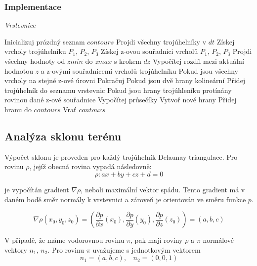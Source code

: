 \documentclass{article}
\begin{document}
\begin{spacing}{1.5}
\newpage

\subsubsection*{Implementace}
\begin{algorithm}[h]
    \caption {\textit{Vrstevnice}}
    \begin{algorithmic}[1]
        \State Inicializuj prázdný seznam $contours$
        \State Projdi všechny trojúhelníky v $dt$
        \State \indent Získej vrcholy trojúhelníku $P_1$, $P_2$, $P_3$ 
        \State \indent Získej z-ovou souřadnici vrcholů $P_1$, $P_2$, $P_3$ 
        \State \indent Projdi všechny hodnoty od $zmin$ do $zmax$ s krokem $dz$
       \State \indent \indent Vypočítej rozdíl mezi aktuální hodnotou $z$ a z-ovými souřadnicemi vrcholů trojúhelníku 
       \State \indent \indent Pokud jsou všechny vrcholy na stejné z-ové úrovni
       \State \indent \indent \indent Pokračuj
       \State \indent \indent Pokud jsou dvě hrany kolineární
       \State \indent \indent \indent Přidej trojúhelník do seznamu vrstevnic 
       \State \indent \indent Pokud jsou hrany trojúhleníku protínány rovinou dané z-ové souřadnice
       \State \indent \indent \indent Vypočítej průsečíky
       \State \indent \indent \indent Vytvoř nové hrany 
       \State \indent \indent \indent Přidej hranu do $contours$
        \State Vrať $contours$
    \end{algorithmic}
\end{algorithm}

\subsection{Analýza sklonu terénu}
Výpočet sklonu je proveden pro každý trojúhelník Delaunay triangulace. Pro rovinu $\rho$, jejíž obecná rovina vypadá následovně: 
$$\rho: ax +by + cz + d = 0$$

je vypočítán gradient $\nabla \rho$, neboli maximální vektor spádu. Tento gradient má v daném bodě směr normály k vrstevnici a zároveň je orientován ve směru funkce $p$.

$$\nabla \rho (x_0 , y_0 , z_0) = \left(\frac{\partial p}{\partial x}(x_0), \frac{\partial p}{\partial y}(y_0), \frac{\partial p}{\partial z}(z_0)  \right) = (a,b,c)$$

V případě, že máme vodorovnou rovinu $\pi$, pak mají roviny $\rho$ a $\pi$ normálové vektory $n_1$, $n_2$. Pro rovinu $\pi$ uvažujeme s jednotkovým vektorem
$$n_1 = (a, b, c), \ \  \ \  n_2 = (0, 0, 1)$$


\end{spacing}
\end{document}
